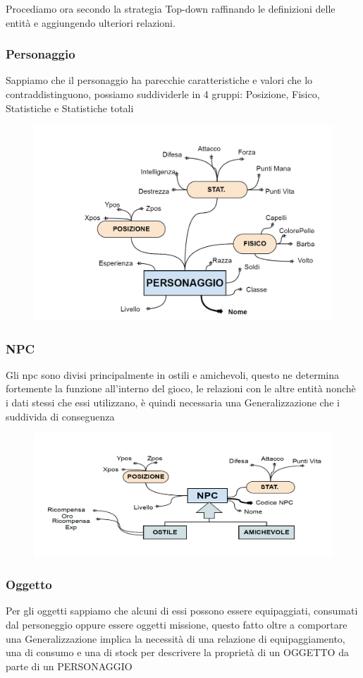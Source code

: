 Procediamo ora secondo la strategia Top-down raffinando le definizioni delle entità e aggiungendo ulteriori relazioni.
\subsubsection{Personaggio} 
Sappiamo che il personaggio ha parecchie caratteristiche e valori che lo contraddistinguono, possiamo suddividerle in 4 gruppi:
Posizione, Fisico, Statistiche e Statistiche totali  

\begin{figure}[H]
\centering
\includegraphics[width=0.7\linewidth]{./immagini/personaggiodef.png}
\end{figure}

\newpage


\subsubsection{NPC} 
Gli npc sono divisi principalmente in ostili e amichevoli, questo ne determina fortemente la funzione all'interno del gioco, le relazioni con le altre entità nonchè i dati stessi che essi utilizzano, è quindi necessaria una Generalizzazione che i suddivida di conseguenza

\begin{figure}[H]
\centering
\includegraphics[width=0.7\linewidth]{./immagini/npcdef.png}
\end{figure}


\subsubsection{Oggetto} 
Per gli oggetti sappiamo che alcuni di essi possono essere equipaggiati, consumati dal personeggio oppure essere oggetti missione, questo fatto oltre a comportare una Generalizzazione implica la necessità di una relazione di equipaggiamento, una di consumo e una di stock per descrivere la proprietà di un OGGETTO da parte di un PERSONAGGIO  

